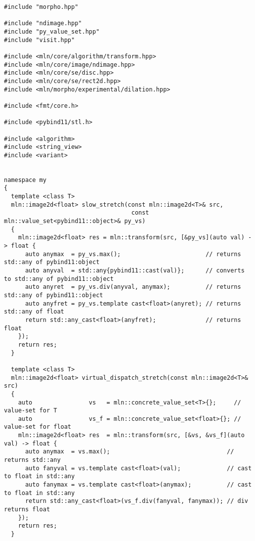 \begin{verbatim}
#include "morpho.hpp"

#include "ndimage.hpp"
#include "py_value_set.hpp"
#include "visit.hpp"

#include <mln/core/algorithm/transform.hpp>
#include <mln/core/image/ndimage.hpp>
#include <mln/core/se/disc.hpp>
#include <mln/core/se/rect2d.hpp>
#include <mln/morpho/experimental/dilation.hpp>

#include <fmt/core.h>

#include <pybind11/stl.h>

#include <algorithm>
#include <string_view>
#include <variant>


namespace my
{
  template <class T>
  mln::image2d<float> slow_stretch(const mln::image2d<T>& src,
                                    const mln::value_set<pybind11::object>& py_vs)
  {
    mln::image2d<float> res = mln::transform(src, [&py_vs](auto val) -> float {
      auto anymax  = py_vs.max();                        // returns std::any of pybind11:object
      auto anyval  = std::any{pybind11::cast(val)};      // converts to std::any of pybind11::object
      auto anyret  = py_vs.div(anyval, anymax);          // returns std::any of pybind11::object
      auto anyfret = py_vs.template cast<float>(anyret); // returns std::any of float
      return std::any_cast<float>(anyfret);              // returns float
    });
    return res;
  }

  template <class T>
  mln::image2d<float> virtual_dispatch_stretch(const mln::image2d<T>& src)
  {
    auto                vs   = mln::concrete_value_set<T>{};     // value-set for T
    auto                vs_f = mln::concrete_value_set<float>{}; // value-set for float
    mln::image2d<float> res  = mln::transform(src, [&vs, &vs_f](auto val) -> float {
      auto anymax  = vs.max();                                 // returns std::any
      auto fanyval = vs.template cast<float>(val);             // cast to float in std::any
      auto fanymax = vs.template cast<float>(anymax);          // cast to float in std::any
      return std::any_cast<float>(vs_f.div(fanyval, fanymax)); // div returns float
    });
    return res;
  }


\end{verbatim}
